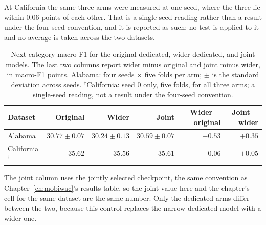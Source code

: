 At California the same three arms were measured at one seed, where the three lie within $0.06$
points of each other. That is a single-seed reading rather than a result under the four-seed
convention, and it is reported as such: no test is applied to it and no average is taken across the
two datasets.

\begin{table}[H]
    \centering
    \caption{Next-category macro-F1 for the original dedicated, wider dedicated,
    and joint models. The last two columns report wider minus original and joint
    minus wider, in macro-F1 points. Alabama: four seeds $\times$ five folds per arm;
    $\pm$ is the standard deviation across seeds. $^{\dagger}$California: seed 0 only,
    five folds, for all three arms; a single-seed reading, not a result under the
    four-seed convention.}
    \label{tab:apx-parameter-comparison}
    {\small
    \setlength{\tabcolsep}{4pt}
    \begin{tabular}{lrrrrr}
        \toprule
        Dataset & Original & Wider & Joint & Wider $-$ original & Joint $-$ wider \\
        \midrule
        Alabama                  & $30.77 \pm 0.07$ & $30.24 \pm 0.13$ & $30.59 \pm 0.07$ & $-0.53$ & $+0.35$ \\
        California$^{\dagger}$   & $35.62$           & $35.56$           & $35.61$           & $-0.06$ & $+0.05$ \\
        \bottomrule
    \end{tabular}
    }
\end{table}

The joint column uses the jointly selected checkpoint, the same convention as
Chapter~\ref{ch:mobiwac}'s results table, so the joint value here and the chapter's cell for the
same dataset are the same number. Only the dedicated arms differ between the two, because this
control replaces the narrow dedicated model with a wider one.

